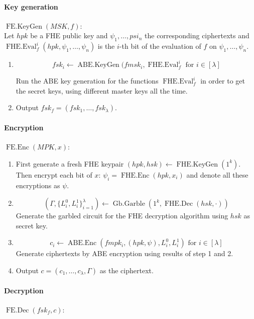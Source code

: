 \documentclass[11pt, a4paper]{article}
\newcommand{\op}[1]{\operatorname{#1}}
\begin{document}
\paragraph{Key generation}
$\op{FE.KeyGen}(MSK, f)$: \\
Let $hpk$ be a FHE public key and $\psi_1, \dots, psi_n$ the corresponding ciphertexts and $\op{FHE.Eval}_f^i(hpk, \psi_1, \dots, \psi_n)$ is the $i$-th bit of the evaluation of $f$ on $\psi_1, \dots, \psi_n$.

\begin{enumerate}
    \item
        \[ fsk_i \gets \op{ABE.KeyGen}(fmsk_i, \op{FHE.Eval}_f^i \text{ for } i \in [\lambda] \]

        Run the ABE key generation for the functions $\op{FHE.Eval}_f^i$ in order to get the secret keys, using different master keys all the time.
    \item
        Output $fsk_f = (fsk_1, \dots, fsk_{\lambda})$.
\end{enumerate}


\paragraph{Encryption}
$\op{FE.Enc}(MPK, x)$:

\begin{enumerate}
    \item First generate a fresh FHE keypair $(hpk, hsk) \gets \op{FHE.KeyGen}(1^k)$. Then encrypt each bit of $x$: $\psi_i = \op{FHE.Enc}(hpk, x_i)$ and denote all these encryptions as $\psi$.
    \item 
        \[
            \left( \Gamma, \{ L_i^0, L_i^1 \}_{i=1}^{\lambda} \right ) \gets \op{Gb.Garble}(1^k, \op{FHE.Dec}(hsk,\cdot))
        \]
        Generate the garbled circuit for the FHE decryption algorithm using $hsk$ as secret key.
    \item
        \[
            c_i \gets \op{ABE.Enc}(fmpk_i, (hpk, \psi), L_i^0, L_i^1) \text{ for } i \in [\lambda]
        \]
        Generate ciphertexts by ABE encryption using results of step 1 and 2.
    \item
        Output $c = (c_1, \dots, c_{\lambda}, \Gamma)$ as the ciphertext.
\end{enumerate}

\paragraph{Decryption}
$\op{FE.Dec}(fsk_f, c)$:
\end{document}
